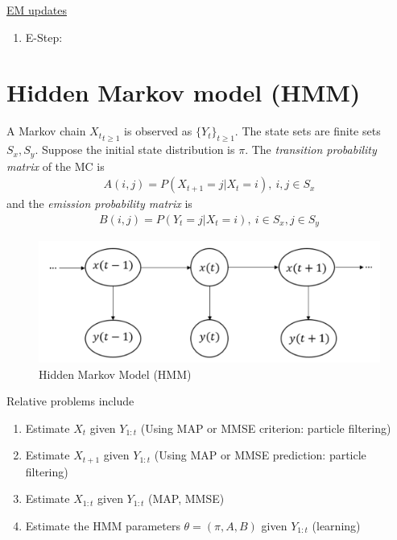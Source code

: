 \documentclass[11pt,a4paper]{article}
\begin{document}
\underline{EM updates}
\begin{enumerate}
    \item E-Step:
\end{enumerate}













\section{Hidden Markov model (HMM)}
A Markov chain ${X_t}_{t\geq 1}$ is observed as $\{Y_t\}_{t\geq 1}$. The state sets are finite sets $S_x, S_y$. Suppose the initial state distribution is $\pi$. The \textit{transition probability matrix} of the MC is
\begin{equation}
    \begin{aligned}
        A(i,j)=P(X_{t+1}=j|X_{t}=i),\ i,j\in S_x
    \end{aligned}
    \nonumber
\end{equation}
and the \textit{emission probability matrix} is
\begin{equation}
    \begin{aligned}
        B(i,j)=P(Y_t=j|X_t=i),\ i\in S_x, j\in S_y
    \end{aligned}
    \nonumber
\end{equation}
\begin{center}\begin{figure}[htbp]
    \centering
    \includegraphics[scale=0.15]{HDM.png}
    \caption{Hidden Markov Model (HMM)}
    \label{}
\end{figure}\end{center}

Relative problems include
\begin{enumerate}
    \item Estimate $X_t$ given $Y_{1:t}$ (Using MAP or MMSE criterion: particle filtering)
    \item Estimate $X_{t+1}$ given $Y_{1:t}$ (Using MAP or MMSE prediction: particle filtering)
    \item Estimate $X_{1:t}$ given $Y_{1:t}$ (MAP, MMSE)
    \item Estimate the HMM parameters $\theta=(\pi,A,B)$ given $Y_{1:t}$ (learning)
\end{enumerate}
\end{document}
